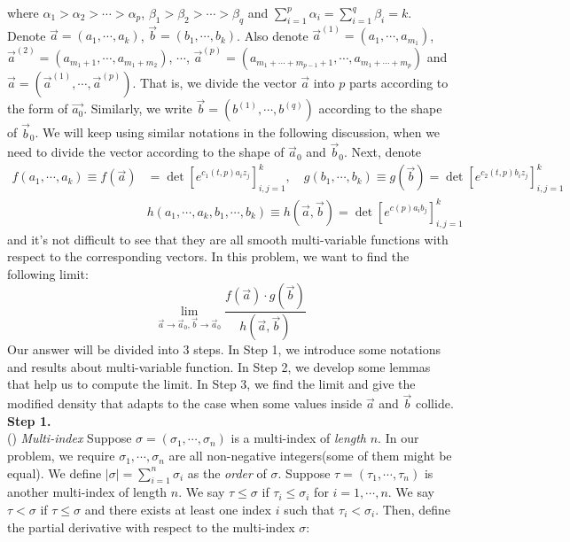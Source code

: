 \documentclass[12pt]{article}
\begin{document}
where $\alpha_{1}>\alpha_{2}>\cdots>\alpha_{p}$, $\beta_{1}>\beta_{2}>\cdots>\beta_{q}$ and $\sum_{i=1}^{p}\alpha_{i}=\sum_{i=1}^{q}\beta_{i}=k$. Denote $\vec{a}=(a_{1},\cdots,a_{k})$, $\vec{b}=(b_{1},\cdots,b_{k})$. Also denote $\vec{a}^{(1)}=(a_{1},\cdots,a_{m_1})$, $\vec{a}^{(2)}=(a_{m_{1}+1},\cdots,a_{m_1+m_2})$, $\cdots$, $\vec{a}^{(p)}=(a_{m_1+\cdots+m_{p-1}+1},\cdots, a_{m_1+\cdots+m_{p}})$ and $\vec{a}=(\vec{a}^{(1)},\cdots,\vec{a}^{(p)})$. That is, we divide the vector $\vec{a}$ into $p$ parts according to the form of $\vec{a_{0}}$. Similarly, we write $\vec{b}=(b^{(1)},\cdots,b^{(q)})$ according to the shape of $\vec{b}_{0}$. We will keep using similar notations in the following discussion, when we need to divide the vector according to the shape of $\vec{a}_{0}$ and $\vec{b}_{0}$. Next, denote
\begin{align*}
	f(a_{1},\cdots,a_{k})\equiv f(\vec{a})&=\det[e^{c_1(t,p)a_{i}z_{j}}]_{i,j=1}^{k},\quad g(b_{1},\cdots,b_{k})\equiv g(\vec{b})=\det[e^{c_2(t,p)b_{i}z_{j}}]_{i,j=1}^{k}\\
	&h(a_{1},\cdots,a_{k},b_{1},\cdots,b_{k})\equiv h(\vec{a},\vec{b})=\det[e^{c(p)a_{i}b_{j}}]_{i,j=1}^{k}
\end{align*} 
and it's not difficult to see that they are all smooth multi-variable functions with respect to the corresponding vectors. In this problem, we want to find the following limit:
\begin{equation*}
	\lim_{\vec{a}\rightarrow \vec{a}_{0},\vec{b}\rightarrow \vec{a}_{0}} \frac{f(\vec{a})\cdot g(\vec{b})}{h(\vec{a},\vec{b})}
\end{equation*}
Our answer will be divided into $3$ steps. In Step 1, we introduce some notations and results about multi-variable function. In Step 2, we develop some lemmas that help us to compute the limit. In Step 3, we find the limit and give the modified density that adapts to the case when some values inside $\vec{a}$ and $\vec{b}$ collide.
\\
\textbf{Step 1. } \\
() \emph{Multi-index} Suppose $\sigma = (\sigma_{1},\cdots,\sigma_{n})$ is a multi-index of \emph{length} $n$. In our problem, we require $\sigma_{1},\cdots,\sigma_{n}$ are all non-negative integers(some of them might be equal). We define $|\sigma|=\sum_{i=1}^{n}\sigma_{i}$ as the \emph{order} of $\sigma$. Suppose $\tau=(\tau_{1},\cdots,\tau_{n})$ is another multi-index of length $n$. We say $\tau\leqslant \sigma$ if $\tau_{i}\leqslant \sigma_{i}$ for $i=1,\cdots,n$. We say $\tau<\sigma$ if $\tau\leqslant \sigma$ and there exists at least one index $i$ such that $\tau_{i}<\sigma_{i}$. Then, define the partial derivative with respect to the multi-index $\sigma$:
\end{document}
